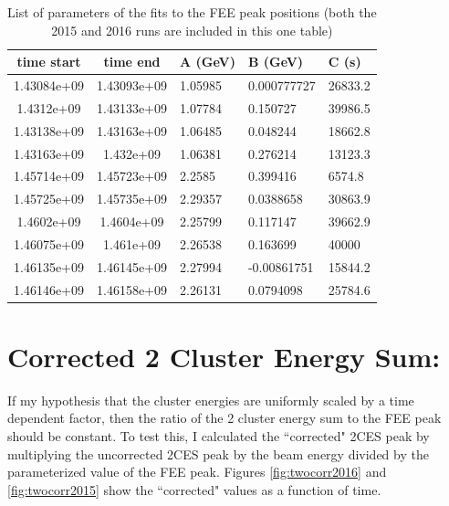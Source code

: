 \documentclass[11pt]{article}
\begin{document}
\begin{table}[htp]
\caption{List of parameters of the fits to the FEE peak positions (both the 2015 and 2016 runs are included in this one table)}
\begin{center}
\begin{tabular}{|c|c|l|l|l|}
\hline
time start & time end & A (GeV) & B (GeV) & C (s) \\
\hline
1.43084e+09 & 1.43093e+09 & 1.05985 & 0.000777727 & 26833.2\\
1.4312e+09 & 1.43133e+09 & 1.07784 & 0.150727 & 39986.5\\
1.43138e+09 & 1.43163e+09 & 1.06485 & 0.048244 & 18662.8\\
1.43163e+09 & 1.432e+09 & 1.06381 & 0.276214 & 13123.3\\
\hline
1.45714e+09 & 1.45723e+09 & 2.2585 & 0.399416 & 6574.8\\
1.45725e+09 & 1.45735e+09 & 2.29357 & 0.0388658 & 30863.9\\
1.4602e+09 & 1.4604e+09 & 2.25799 & 0.117147 & 39662.9\\
1.46075e+09 & 1.461e+09 & 2.26538 & 0.163699 & 40000\\
1.46135e+09 & 1.46145e+09 & 2.27994 & -0.00861751 & 15844.2\\
1.46146e+09 & 1.46158e+09 & 2.26131 & 0.0794098 & 25784.6\\
\hline
\end{tabular}
\end{center}
\label{tab:time_fit}
\end{table}%


\FloatBarrier
\section{Corrected 2 Cluster Energy Sum:}

If my hypothesis that the cluster energies are uniformly scaled by a time dependent factor, then  the ratio of the 2 cluster energy sum to the FEE peak should be constant.  
To test this, I calculated the ``corrected" 2CES peak by multiplying the uncorrected 2CES peak by the beam energy divided by the parameterized value of the FEE peak.  Figures \ref{fig:twocorr2016} and 
\ref{fig:twocorr2015} show the ``corrected" values as a function of time.  
\end{document}
